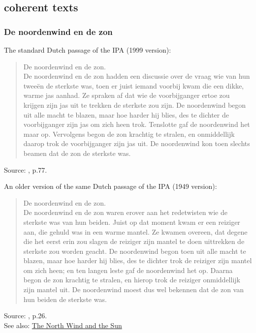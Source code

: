 \documentclass[
]{book}
\begin{document}
\subsection{coherent texts}\label{coherent-texts}

\subsubsection{De noordenwind en de zon}\label{de-noordenwind-en-de-zon}

The standard Dutch passage of the IPA (1999 version):

\begin{quote}
De noordenwind en de zon.\\
De noordenwind en de zon hadden een discussie over de vraag wie van hun tweeën de sterkste was, toen er juist iemand voorbij kwam die een dikke, warme jas aanhad. Ze spraken af dat wie de voorbijganger ertoe zou krijgen zijn jas uit te trekken de sterkste zou zijn. De noordenwind begon uit alle macht te blazen, maar hoe harder hij blies, des te dichter de voorbijganger zijn jas om zich heen trok. Tenslotte gaf de noordenwind het maar op. Vervolgens begon de zon krachtig te stralen, en onmiddellijk daarop trok de voorbijganger zijn jas uit. De noordenwind kon toen slechts beamen dat de zon de sterkste was.
\end{quote}

Source: \citet{HandbookIPA_1999}, p.77.

An older version of the same Dutch passage of the IPA (1949 version):

\begin{quote}
De noordenwind en de zon.\\
De noordenwind en de zon waren erover aan het redetwisten wie de sterkste was van hun beiden.
Juist op dat moment kwam er een reiziger aan, die gehuld was in een warme mantel.
Ze kwamen overeen, dat degene die het eerst erin zou slagen de reiziger zijn mantel te doen uittrekken de sterkste zou worden geacht.
De noordenwind begon toen uit alle macht te blazen, maar hoe harder hij blies, des te dichter trok de reiziger zijn mantel om zich heen; en ten langen leste gaf de noordenwind het op.
Daarna begon de zon krachtig te stralen, en hierop trok de reiziger onmiddellijk zijn mantel uit.
De noordenwind moest dus wel bekennen dat de zon van hun beiden de sterkste was.
\end{quote}

Source: \citet{InternationalPhoneticAssociation_1949}, p.26.\\
See also: \href{https://en.wikipedia.org/wiki/The_North_Wind_and_the_Sun}{The North Wind and the Sun}
\end{document}
